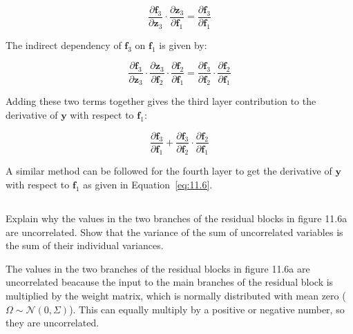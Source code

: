\documentclass[12pt]{report}
\begin{document}
\begin{equation*}
    \frac{\partial \mathbf{f}_{3}}{\partial \mathbf{z}_{3}} \cdot \frac{\partial \mathbf{z}_{3}}{\partial \mathbf{f}_{1}} = \frac{\partial \mathbf{f}_{3}}{\partial \mathbf{f}_{1}}
\end{equation*}

The indirect dependency of $\mathbf{f}_{3}$ on $\mathbf{f}_{1}$ is given by:

\begin{equation*}
    \frac{\partial \mathbf{f}_{3}}{\partial \mathbf{z}_{3}} \cdot \frac{\partial \mathbf{z}_{3}}{\partial \mathbf{f}_{2}} \cdot \frac{\partial \mathbf{f}_{2}}{\partial \mathbf{f}_{1}} = \frac{\partial \mathbf{f}_{3}}{\partial \mathbf{f}_{2}} \cdot \frac{\partial \mathbf{f}_{2}}{\partial \mathbf{f}_{1}}
\end{equation*}

Adding these two terms together gives the third layer contribution to the derivative of $\mathbf{y}$ with respect to $\mathbf{f}_{1}$:

\begin{equation*}
    \frac{\partial \mathbf{f}_{3}}{\partial \mathbf{f}_{1}} + \frac{\partial \mathbf{f}_{3}}{\partial \mathbf{f}_{2}} \cdot \frac{\partial \mathbf{f}_{2}}{\partial \mathbf{f}_{1}}
\end{equation*}

A similar method can be followed for the fourth layer to get the derivative of $\mathbf{y}$ with respect to $\mathbf{f}_{1}$ as given in Equation~\eqref{eq:11.6}.



\subsection{}
\begin{mdframed}
    Explain why the values in the two branches of the residual blocks in figure 11.6a are uncorrelated. Show that the variance of the sum of uncorrelated variables is the sum of their individual variances.
\end{mdframed}

The values in the two branches of the residual blocks in figure 11.6a are uncorrelated beacause the input to the main branches of the residual block is multiplied by the weight matrix, which is normally distributed with mean zero ($\Omega \sim \mathcal{N}(0, \Sigma)$). This can equally multiply by a positive or negative number, so they are uncorrelated.
\end{document}
